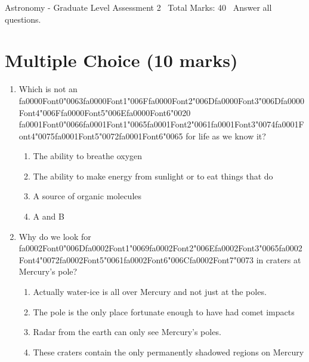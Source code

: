 \documentclass[12pt]{article}
\begin{document}
\begin{center}
Astronomy - Graduate Level Assessment 2 \
Total Marks: 40 \
Answer all questions.
\end{center}

\section*{Multiple Choice (10 marks)}
\begin{enumerate}[label=\arabic*.]
\item Which is not an {\csname fa0000Font0\endcsname\char"0063}{\csname fa0000Font1\endcsname\char"006F}{\csname fa0000Font2\endcsname\char"006D}{\csname fa0000Font3\endcsname\char"006D}{\csname fa0000Font4\endcsname\char"006F}{\csname fa0000Font5\endcsname\char"006E}{\csname fa0000Font6\endcsname\char"0020} {\csname fa0001Font0\endcsname\char"0066}{\csname fa0001Font1\endcsname\char"0065}{\csname fa0001Font2\endcsname\char"0061}{\csname fa0001Font3\endcsname\char"0074}{\csname fa0001Font4\endcsname\char"0075}{\csname fa0001Font5\endcsname\char"0072}{\csname fa0001Font6\endcsname\char"0065} for life as we know it?
\begin{enumerate}[label=(\alph*)]
    \item The ability to breathe oxygen
    \item The ability to make energy from sunlight or to eat things that do
    \item A source of organic molecules
    \item A and B
\end{enumerate}
\item Why do we look for {\csname fa0002Font0\endcsname\char"006D}{\csname fa0002Font1\endcsname\char"0069}{\csname fa0002Font2\endcsname\char"006E}{\csname fa0002Font3\endcsname\char"0065}{\csname fa0002Font4\endcsname\char"0072}{\csname fa0002Font5\endcsname\char"0061}{\csname fa0002Font6\endcsname\char"006C}{\csname fa0002Font7\endcsname\char"0073} in craters at Mercury's pole?
\begin{enumerate}[label=(\alph*)]
    \item Actually water-ice is all over Mercury and not just at the poles.
    \item The pole is the only place fortunate enough to have had comet impacts
    \item Radar from the earth can only see Mercury's poles.
    \item These craters contain the only permanently shadowed regions on Mercury
\end{enumerate}

\end{enumerate}
\end{document}
